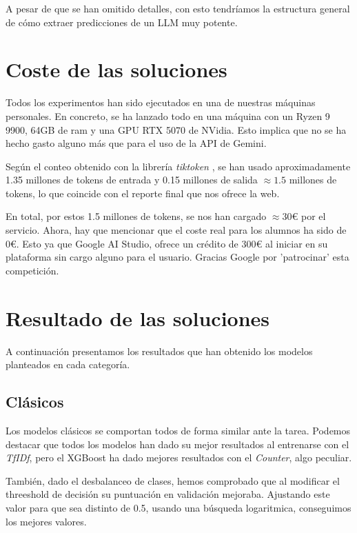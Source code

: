 \documentclass[11pt,spanish,listoffigures,listoftables]{tfgetsinf}
\begin{document}
A pesar de que se han omitido detalles, con esto tendríamos la estructura general de cómo extraer predicciones de un LLM muy potente.

\chapter{Coste de las soluciones}
Todos los experimentos han sido ejecutados en una de nuestras máquinas personales. En concreto, se ha lanzado todo en una máquina con un Ryzen 9 9900, 64GB de ram y una GPU RTX 5070 de NVidia. Esto implica que no se ha hecho gasto alguno más que para el uso de la API de Gemini.

Según el conteo obtenido con la librería \textit{tiktoken} \cite{tiktoken-pypi}, se han usado aproximadamente 1.35 millones de tokens de entrada y 0.15 millones de salida $\approx 1.5$ millones de tokens, lo que coincide con el reporte final que nos ofrece la web.

En total, por estos 1.5 millones de tokens, se nos han cargado $\approx 30$€ por el servicio. Ahora, hay que mencionar que el coste real para los alumnos ha sido de $0$€. Esto ya que Google AI Studio, ofrece un crédito de $300$€ al iniciar en su plataforma sin cargo alguno para el usuario. Gracias Google por 'patrocinar' esta competición. 

\chapter{Resultado de las soluciones}
A continuación presentamos los resultados que han obtenido los modelos planteados en cada categoría.

\section{Clásicos}
Los modelos clásicos se comportan todos de forma similar ante la tarea. Podemos destacar que todos los modelos han dado su mejor resultados al entrenarse con el \textit{TfIDf}, pero el XGBoost ha dado mejores resultados con el \textit{Counter}, algo peculiar. 

También, dado el desbalanceo de clases, hemos comprobado que al modificar el threeshold de decisión su puntuación en validación mejoraba. Ajustando este valor para que sea distinto de 0.5, usando una búsqueda logaritmica, conseguimos los mejores valores. 
\end{document}
